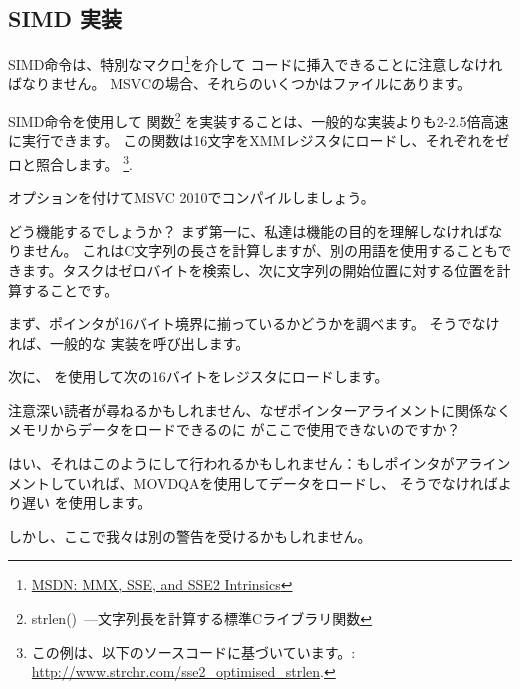﻿\subsection{SIMD \strlen 実装}
\label{SIMD_strlen}

\newcommand{\URLMSDNSSE}{\href{http://msdn.microsoft.com/en-us/library/y0dh78ez(VS.80).aspx}{MSDN: MMX, SSE, and SSE2 Intrinsics}}

SIMD命令は、特別なマクロ\footnote{\URLMSDNSSE}を介して \CCpp コードに挿入できることに注意しなければなりません。 
MSVCの場合、それらのいくつかはファイルにあります。

\newcommand{\URLSTRLEN}{http://www.strchr.com/sse2_optimised_strlen}


SIMD命令を使用して \strlen 関数\footnote{strlen()~---文字列長を計算する標準Cライブラリ関数}
を実装することは、一般的な実装よりも2-2.5倍高速に実行できます。
この関数は16文字をXMMレジスタにロードし、それぞれをゼロと照合します。
\footnote{
この例は、以下のソースコードに基づいています。: \url{\URLSTRLEN}.}.



\Ox オプションを付けてMSVC 2010でコンパイルしましょう。



どう機能するでしょうか？
まず第一に、私達は機能の目的を理解しなければなりません。
これはC文字列の長さを計算しますが、別の用語を使用することもできます。タスクはゼロバイトを検索し、次に文字列の開始位置に対する位置を計算することです。

まず、ポインタが16バイト境界に揃っているかどうかを調べます。
そうでなければ、一般的な \strlen 実装を呼び出します。

次に、 \MOVDQA を使用して次の16バイトをレジスタにロードします。

注意深い読者が尋ねるかもしれません、なぜポインターアライメントに関係なくメモリからデータをロードできるのに
\MOVDQU がここで使用できないのですか？

はい、それはこのようにして行われるかもしれません：もしポインタがアラインメントしていれば、MOVDQAを使用してデータをロードし、
そうでなければより遅い \MOVDQU を使用します。

しかし、ここで我々は別の警告を受けるかもしれません。

\newcommand{\URLPAGE}{\href{http://en.wikipedia.org/wiki/Page_(computer_memory)}{wikipedia}}

